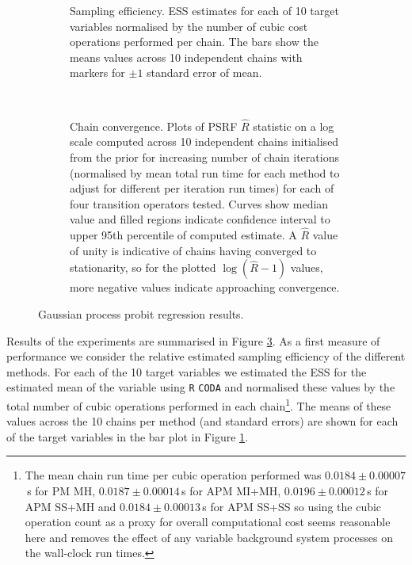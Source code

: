 \begin{figure}[!t]
\centering
\begin{subfigure}[b]{\linewidth}
\centering
{}
\caption{Sampling efficiency. \ac{ESS} estimates for each of 10 target variables normalised by the number of cubic cost operations performed per chain. The bars show the means values across 10 independent chains with markers for $\pm 1$ standard error of mean.}
\label{sfig:gaussian-process-probit-regressions-pm-ess-plot}
\end{subfigure}
\\[3mm]
\begin{subfigure}[b]{\linewidth}
\centering
{}
\caption{Chain convergence. Plots of \acs{PSRF} $\hat{R}$ statistic on a log scale computed across 10 independent chains initialised from the prior for increasing number of chain iterations (normalised by mean total run time for each method to adjust for different per iteration run times) for each of four transition operators tested. Curves show median value and filled regions indicate confidence interval to upper 95th percentile of computed estimate. A $\hat{R}$ value of unity is indicative of chains having converged to stationarity, so for the plotted $\log(\hat{R} - 1)$ values, more negative values indicate approaching convergence.}
\label{sfig:gaussian-process-probit-regressions-pm-prsf-plot}
\end{subfigure}
\caption[Gaussian process probit regression results.]{Gaussian process probit regression results.}
\label{fig:pm-gp-probit-regression-results}
\end{figure}

Results of the experiments are summarised in Figure \ref{fig:pm-gp-probit-regression-results}. As a first measure of performance we consider the relative estimated sampling efficiency of the different methods. For each of the 10 target variables we estimated the \ac{ESS} for the estimated mean of the variable using \texttt{R} \texttt{CODA} \citep{plummer2006coda} and normalised these values by the total number of cubic operations performed in each chain\footnote{The mean chain run time per cubic operation performed was $0.0184 \pm 0.00007$\,s for \ac{PM} \ac{MH}, $0.0187 \pm 0.00014$\,s for \ac{APM} \ac{MI}+\ac{MH}, $0.0196 \pm 0.00012$\,s for \ac{APM} \ac{SS}+\ac{MH} and $0.0184 \pm 0.00013$\,s for \ac{APM} \ac{SS}+\ac{SS} so using the cubic operation count as a proxy for overall computational cost seems reasonable here and removes the effect of any variable background system processes on the wall-clock run times.}. The means of these values across the 10 chains per method (and standard errors) are shown for each of the target variables in the bar plot in Figure \ref{sfig:gaussian-process-probit-regressions-pm-ess-plot}.

